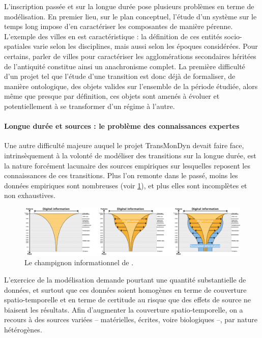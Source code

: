 L'inscription passée et sur la longue durée pose plusieurs problèmes en terme de modélisation.
En premier lieu, sur le plan conceptuel, l'étude d'un système sur le temps long impose d'en caractériser les composantes de manière pérenne.
L'exemple des \og villes \og en est caractéristique : la définition de ces entités socio-spatiales varie selon les disciplines, mais aussi selon les époques considérées.
Pour certains, parler de villes pour caractériser les agglomérations secondaires héritées de l'antiquité constitue ainsi un anachronisme complet.
La première difficulté d'un projet tel que l'étude d'une transition est donc déjà de formaliser, de manière ontologique, des objets valides sur l'ensemble de la période étudiée, alors même que presque par définition, ces objets sont amenés à évoluer et potentiellement à se transformer d'un régime à l'autre.

\paragraph{Longue durée et sources : le problème des \og connaissances expertes\fg{}}

Une autre difficulté majeure auquel le projet TransMonDyn devait faire face, intrinsèquement à la volonté de modéliser des transitions sur la longue durée, est la nature forcément lacunaire des sources empiriques sur lesquelles reposent les connaissances de ces transitions.
Plus l'on remonte dans le passé, moins les données empiriques sont nombreuses (voir \cref{fig:champignon-kaplan}), et plus elles sont incomplètes et non exhaustives.
\begin{figure}[H]
	\centering
	\includegraphics[width=\linewidth]{img/champignon_informationnel_kaplan.pdf}
	\caption{Le \og champignon informationnel\fg{} de \textcite{kaplan_lancement_2013}.}
	\label{fig:champignon-kaplan}
\end{figure}

L'exercice de la modélisation demande pourtant une quantité substantielle de données, et surtout que ces données soient homogènes en terme de couverture spatio-temporelle et en terme de certitude au risque que des \og effets de source\fg{} ne biaisent les résultats.
Afin d'augmenter la couverture spatio-temporelle, on a recours à des sources variées -- matérielles, écrites, voire biologiques --, par nature hétérogènes.

